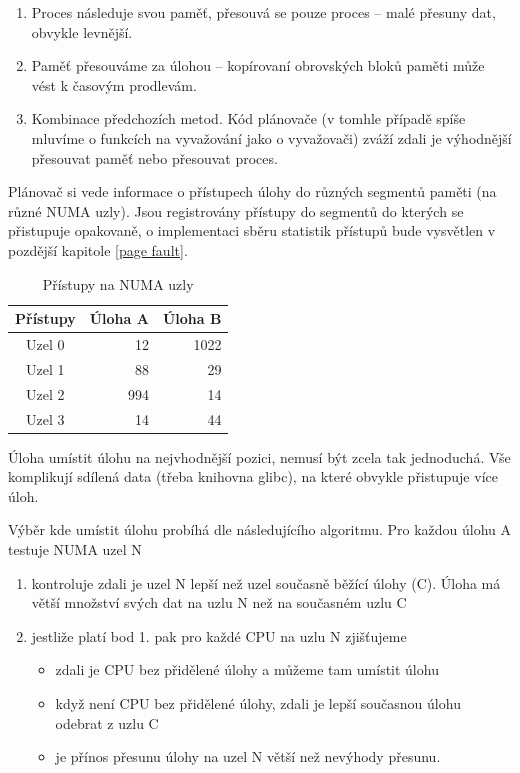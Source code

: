 \documentclass[
  master=true,
  font=sans,
  printversion=false,
  joinlists=true,
  figures=true,
  tables=true,
  sourcecodes=false,
  theorems=false,
  bibencoding=utf8,
  language=czech,
  encoding=utf8,
  field=ainfk,
  biblatex,
  glossaries,
  index
]{kidiplom}
\begin{document}
\begin{enumerate}
\item Proces následuje svou paměť, přesouvá se pouze proces – malé přesuny dat, obvykle levnější.
\item Paměť přesouváme za úlohou – kopírovaní obrovských bloků paměti může vést k časovým prodlevám.
\item Kombinace předchozích metod. Kód plánovače (v tomhle případě spíše mluvíme o funkcích na vyvažování jako o vyvažovači) zváží zdali je výhodnější přesouvat paměť nebo přesouvat proces.
\end{enumerate}

Plánovač si vede informace o přístupech úlohy do různých segmentů paměti (na různé NUMA uzly). Jsou registrovány přístupy do segmentů do kterých se přistupuje opakovaně, o implementaci sběru statistik přístupů bude vysvětlen v pozdější kapitole \ref{page fault}.

\begin{table}[ht]
\centering
\begin{tabular}{|c|r|r|}
\hline
Přístupy & Úloha A & Úloha B \\
\hline
Uzel 0 & 12 & 1022 \\
\hline
Uzel 1 & 88 & 29 \\
\hline
Uzel 2 & 994 & 14 \\
\hline
Uzel 3 & 14 & 44 \\
\hline
\end{tabular}

\caption{Přístupy na NUMA uzly}
\label{table1}
\end{table}

Úloha umístit úlohu na nejvhodnější pozici, nemusí být zcela tak jednoduchá. Vše komplikují sdílená data (třeba knihovna glibc), na které obvykle přistupuje více úloh. 

Výběr kde umístit úlohu probíhá dle následujícího algoritmu. 
Pro každou úlohu A testuje NUMA uzel N
\begin{enumerate}
\item kontroluje zdali je uzel N lepší než uzel současně běžící úlohy (C). Úloha má větší množství svých dat na uzlu N než na současném uzlu C
\item jestliže platí bod 1. pak pro každé CPU na uzlu N zjišťujeme 
\begin{itemize}
\item zdali je CPU bez přidělené úlohy a můžeme tam umístit úlohu
\item když není CPU bez přidělené úlohy,  zdali je lepší současnou úlohu odebrat z uzlu C
\item je přínos přesunu úlohy na uzel N větší než nevýhody přesunu.
\end{itemize}
\end{enumerate}
\end{document}

